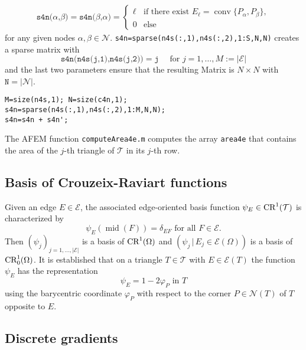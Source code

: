 \begin{align*}
\texttt{s4n($\alpha$,$\beta$)} =
\texttt{s4n($\beta$,$\alpha$)} =
\begin{cases}
 \ell & \text{if there exist } E_\ell = \operatorname*{conv} \{ P_\alpha, P_\beta \},\\
    0 & \text{else}
\end{cases}
\end{align*}
for any given nodes $\alpha,\beta\in\mathcal{N}$.
\texttt{s4n=sparse(n4s(:,1),n4s(:,2),1:S,N,N)}
creates a sparse matrix with
\begin{equation*}
  \texttt{s4n(n4s(j,1),n4s(j,2))} = \texttt j \quad \text{ for } j = 1,\ldots,M := \lvert 
  \mathcal{E} \rvert
\end{equation*}
and the last two parameters ensure that the resulting
Matrix is \(N \times N\) with
$
\texttt N = \lvert \mathcal{N} \rvert
$. 
\begin{lstlisting}[frame=single,numbers=none]
M=size(n4s,1); N=size(c4n,1);
s4n=sparse(n4s(:,1),n4s(:,2),1:M,N,N);
s4n=s4n + s4n';
\end{lstlisting}
The AFEM function \texttt{computeArea4e.m} computes the 
array \texttt{area4e} that contains the area of the $j$-th 
triangle of $\mathcal T$ 
in its $j$-th row.
\subsection{Basis of Crouzeix-Raviart functions \cite{Carstensen2017script}}
Given an edge $E\in\mathcal E$, the associated edge-oriented basis function
$\psi_E\in\textup{CR}^1(\mathcal T)$ is characterized by
\[
\psi_E(\operatorname{mid}(F))=\delta_{EF} \text{ for all } F\in\mathcal E.
\]
Then $(\psi_j)_{j=1,\dots,|\mathcal{E}|}$ is a basis of $\textup{CR}^1(\Omega)$
and $(\psi_j \, | \, E_j\in\mathcal{E}(\Omega))$ is a basis of $\textup{CR}^1_0(\Omega)$.
It is established that on a triangle $T\in\mathcal T$ with $E\in\mathcal E (T)$ the
function
$\psi_E$ has the representation
\[
\psi_E = 1-2\varphi_P \text{ in } T
\] using the barycentric coordinate $\varphi_P$ with respect to 
the corner $P\in\mathcal N (T)$ of $T$ opposite to $E$.

\subsection{Discrete gradients }\label{sec:DiscreteGradients}

